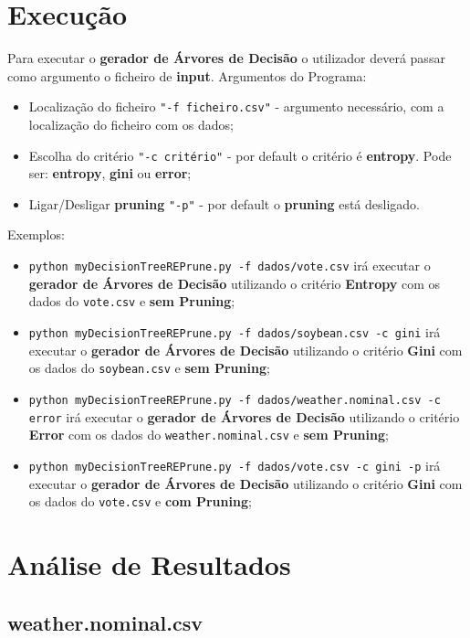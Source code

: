 \documentclass[11pt]{article}   %
\begin{document}
\section{Execução}
\hspace{0,5cm}Para executar o \textbf{gerador de Árvores de Decisão} o utilizador deverá passar como argumento o ficheiro de \textbf{input}.
Argumentos do Programa:
\begin{itemize}
    \item Localização do ficheiro \verb|"-f ficheiro.csv"| - argumento necessário, com a localização do ficheiro com os dados;
    \item Escolha do critério \verb|"-c critério"| - por default o critério é \textbf{entropy}. Pode ser: \textbf{entropy}, \textbf{gini} ou \textbf{error};
    \item Ligar/Desligar \textbf{pruning} \verb|"-p"| - por default o \textbf{pruning} está desligado.
\end{itemize}
\par Exemplos:
\begin{itemize}
    \item \verb|python myDecisionTreeREPrune.py -f dados/vote.csv| irá executar o \textbf{gerador de Árvores de Decisão} utilizando o critério \textbf{Entropy} com os dados do \verb|vote.csv| e \textbf{sem Pruning};
    \item \verb|python myDecisionTreeREPrune.py -f dados/soybean.csv -c gini| irá executar o \textbf{gerador de Árvores de Decisão} utilizando o critério \textbf{Gini} com os dados do \verb|soybean.csv| e \textbf{sem Pruning};
    \item \verb|python myDecisionTreeREPrune.py -f dados/weather.nominal.csv -c error| irá executar o \textbf{gerador de Árvores de Decisão} utilizando o critério \textbf{Error} com os dados do \verb|weather.nominal.csv| e \textbf{sem Pruning};
    \item \verb|python myDecisionTreeREPrune.py -f dados/vote.csv -c gini -p| irá executar o \textbf{gerador de Árvores de Decisão} utilizando o critério \textbf{Gini} com os dados do \verb|vote.csv| e \textbf{com Pruning};
\end{itemize}
\section{Análise de Resultados}
\subsection{weather.nominal.csv}
\end{document}
